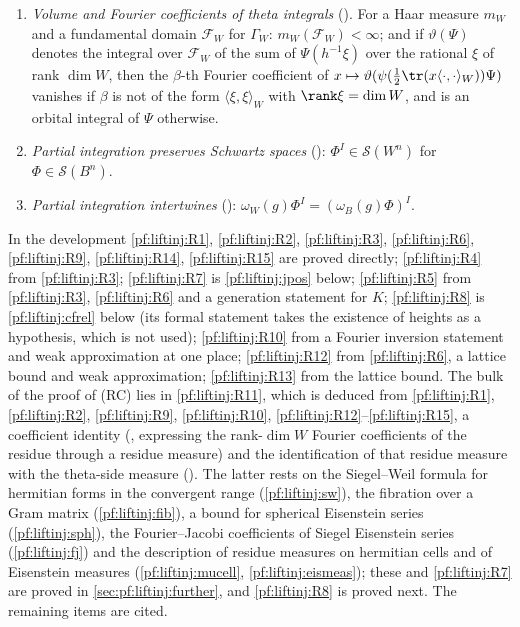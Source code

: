 \begin{enumerate}[label=(R\arabic*)]
subgroup at $v$, bounded on $C\times G_W$ for every compact $C\subseteq G_n$, and given by an explicit sum over rank-$\dim W$ matrices along $n(x)g$.
\item\label{pf:liftinj:R13} \emph{Volume and Fourier coefficients of theta integrals} (). For a Haar
measure $m_W$ and a fundamental domain $\mathcal F_W$ for $\Gamma_W$: $m_W(\mathcal F_W)<\infty$; and if $\vartheta(\Psi)$ denotes the integral over
$\mathcal F_W$ of the sum of $\Psi(h^{-1}\xi)$ over the rational $\xi$ of rank $\dim W$, then the $\beta$-th Fourier coefficient of
$x\mapsto\vartheta(\psi(\frac12\tr(x\langle\cdot,\cdot\rangle_W))\Psi)$ vanishes if $\beta$ is not of the form $\langle\xi,\xi\rangle_W$ with
$\rank\xi=\dim W$, and is an orbital integral of $\Psi$ otherwise.
\item\label{pf:liftinj:R14} \emph{Partial integration preserves Schwartz spaces} ():
$\Phi^I\in\mathcal S(W^n)$ for $\Phi\in\mathcal S(B^n)$.
\item\label{pf:liftinj:R15} \emph{Partial integration intertwines} ():
$\omega_W(g)\Phi^I=(\omega_B(g)\Phi)^I$.
\end{enumerate}
In the development \ref{pf:liftinj:R1}, \ref{pf:liftinj:R2}, \ref{pf:liftinj:R3}, \ref{pf:liftinj:R6}, \ref{pf:liftinj:R9},
\ref{pf:liftinj:R14}, \ref{pf:liftinj:R15} are proved directly; \ref{pf:liftinj:R4} from \ref{pf:liftinj:R3}; \ref{pf:liftinj:R7} is
\cref{pf:liftinj:jpos} below;
\ref{pf:liftinj:R5} from \ref{pf:liftinj:R3}, \ref{pf:liftinj:R6} and a generation statement for $K$; \ref{pf:liftinj:R8} is
\cref{pf:liftinj:cfrel} below (its formal statement takes the existence of heights as a hypothesis, which is not used); \ref{pf:liftinj:R10} from a
Fourier inversion statement and weak approximation at one place; \ref{pf:liftinj:R12} from
\ref{pf:liftinj:R6}, a lattice bound and weak approximation; \ref{pf:liftinj:R13} from the lattice bound. The bulk of the proof of (RC) lies in
\ref{pf:liftinj:R11}, which is deduced from \ref{pf:liftinj:R1}, \ref{pf:liftinj:R2}, \ref{pf:liftinj:R9}, \ref{pf:liftinj:R10},
\ref{pf:liftinj:R12}--\ref{pf:liftinj:R15}, a coefficient identity (, expressing the
rank-$\dim W$ Fourier coefficients of the residue through a residue measure) and the identification of that residue measure with the
theta-side measure (). The latter rests on the Siegel--Weil formula for hermitian forms in the
convergent range (\cref{pf:liftinj:sw}), the fibration over a Gram matrix (\cref{pf:liftinj:fib}), a bound for spherical Eisenstein series
(\cref{pf:liftinj:sph}), the Fourier--Jacobi coefficients of Siegel Eisenstein series (\cref{pf:liftinj:fj}) and the description of residue measures on
hermitian cells and of Eisenstein measures (\cref{pf:liftinj:mucell}, \cref{pf:liftinj:eismeas}); these and \ref{pf:liftinj:R7} are proved in
\cref{sec:pf:liftinj:further}, and \ref{pf:liftinj:R8} is proved next. The remaining items are cited.


